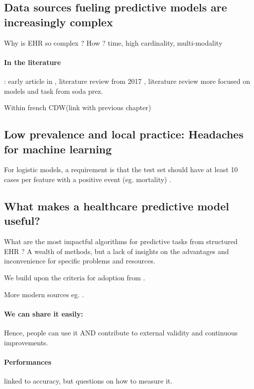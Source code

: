 \documentclass{report}
\begin{document}
\subsection{Data sources fueling predictive models are increasingly complex}\label{subsec:predictive_models:complex_data}

Why is EHR so complex ? How ? time, high cardinality, multi-modality

\paragraph{In the literature}: early article in \cite{wu2010prediction},
literature review from 2017 \citep{goldstein2017opportunities}, literature
review more focused on models and task from soda prez.

Within french CDW(link with previous chapter)

\subsection{Low prevalence and local practice: Headaches for machine learning}\label{subsec:predictive_models:low_prevalence}

For logistic models, a requirement is that the test set should have at least 10
cases per feature with a positive event (eg. mortality)
\citep{harrell1985regression,wyatt1995commentary}.

\subsection{What makes a healthcare predictive model useful?}\label{subsec:predictive_models:useful}

What are the most impactful algorithms for predictive tasks from structured EHR
? A wealth of methods, but a lack of insights on the advantages and
inconvenience for specific problems and resources.

We build upon the criteria for adoption from \cite{wyatt1995commentary}.

More modern sources eg. \cite{subbaswamy2020development}.

\paragraph{We can share it easily: } Hence, people can use it AND contribute to
external validity and continuous improvements.

\paragraph{Performances} linked to accuracy, but questions on how to measure it.
\end{document}
